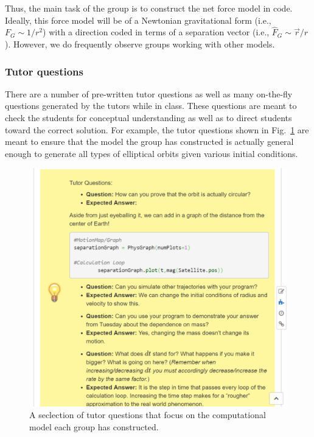 \documentclass{msuphddissertation}
\begin{document}
\begin{doublespace}
Thus, the main task of the group is to construct the net force model in code.  Ideally, this force model will be of a Newtonian gravitational form (i.e., $F_{G}\sim1/r^{2}$) with a direction coded in terms of a separation vector (i.e., $\hat{F}_{G}\sim\vec{r}/r$).  However, we do frequently observe groups working with other models.

\subsubsection{Tutor questions}

There are a number of pre-written tutor questions as well as many on-the-fly questions generated by the tutors while in class.  These questions are meant to check the students for conceptual understanding as well as to direct students toward the correct solution.  For example, the tutor questions shown in Fig.~\ref{CH3:TutorQuestion} are meant to ensure that the model the group has constructed is actually general enough to generate all types of elliptical orbits given various initial conditions.

\begin{figure}[ht]\centering
\includegraphics[scale=0.5]{images/CH3TutorQuestion.pdf}
\caption{A seclection of tutor questions that focus on the computational model each group has constructed.}\label{CH3:TutorQuestion}
\end{figure}


\end{doublespace}
\end{document}
